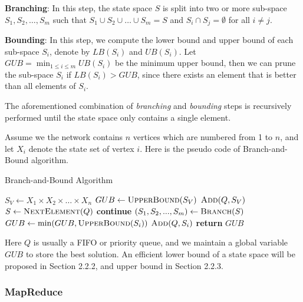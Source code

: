 \noindent \textbf{Branching}: In this step, the state space $S$ is split into two or more sub-space $S_1,S_2,\dots,S_m$ such that $S_1\cup S_2\cup\dots\cup S_m=S$ and $S_i\cap S_j=\emptyset$ for all $i\neq j$.

\noindent \textbf{Bounding}: In this step, we compute the lower bound and upper bound of each sub-space $S_i$, denote by $LB(S_i)$ and $UB(S_i)$. Let $GUB=\min_{1\le i\le m}UB(S_i)$ be the minimum upper bound, then we can prune the sub-space $S_i$ if $LB(S_i)>GUB$, since there exists an element that is better than all elements of $S_i$.

The aforementioned combination of \textit{branching} and \textit{bounding} steps is recursively performed until the state space only contains a single element.

Assume we the network contains $n$ vertices which are numbered from 1 to $n$, and let $X_i$ denote the state set of vertex $i$. Here is the pseudo code of Branch-and-Bound algorithm.

\begin{algorithm}[!h]
\caption{Branch-and-Bound Algorithm}
\begin{algorithmic}[1]
    \State $S_V \gets X_1\times X_2\times\dots\times X_n$
    \State $GUB \gets \textsc{UpperBound}(S_V)$
    \State $\textsc{Add}(Q, S_V)$
        \State $S \gets \textsc{NextElement}(Q)$
            \State \textbf{continue}
        \EndIf
        \State $(S_1,S_2,...,S_m) \gets \textsc{Branch}(S)$
            \State $GUB \gets \min(GUB, \textsc{UpperBound}(S_i))$
        \EndFor
                \State $\textsc{Add}(Q, S_i)$
            \EndIf
        \EndFor
    \EndWhile
    \State \textbf{return }$GUB$
\EndFunction
\end{algorithmic}
\end{algorithm}

Here $Q$ is usually a FIFO or priority queue, and we maintain a global variable $GUB$ to store the best solution. An efficient lower bound of a state space will be proposed in Section 2.2.2, and upper bound in Section 2.2.3.

\subsubsection{MapReduce}\

